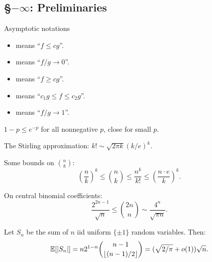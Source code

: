 \documentclass[11pt]{article}
\begin{document}
\begin{prelims}
\section*{\S$-\infty$: Preliminaries}
\begin{itemise}
\item Asymptotic notations
\begin{itemize}\squishlist
\item {} means ``$f\leq cg$''.
\item {} means ``$f/g\rightarrow0$''.
\item {} means ``$f\geq cg$''.
\item {} means ``$c_1 g\leq f\leq c_2 g$''.
\item {} means ``$f/g\rightarrow1$''.
\end{itemize}
\item $1-p\leq e^{-p}$ for all nonnegative $p$, close for small $p$.
\item The Stirling approximation: $k!\sim \sqrt{2\pi k}(k/e)^k$.
\item Some bounds on ${n\choose k}$:
\[\left(\frac{n}{k}\right)^k\leq {n\choose k}\leq\frac{n^k}{k!}\leq\left(\frac{n\cdot e}{k}\right)^k.\]
\item On central binomial coefficients:
\[\frac{2^{2n-1}}{\sqrt n}\leq {2n\choose n}\sim\frac{4^n}{\sqrt{\pi n}}.\]
\item Let $S_n$ be the sum of $n$ iid uniform $\{\pm1\}$ random variables. Then:
\[\operatorname{\mathbb{E}}[|S_n|]=n2^{1-n}{n-1\choose\lfloor(n-1)/2\rfloor}=(\sqrt{2/\pi}+o(1))\sqrt n.\]
\end{itemise}
\end{prelims}
\end{document}
